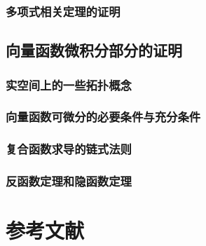 \documentclass[zihao=-4,linespread=1.5,a4paper,heading=true,twoside]{ctexbook}
\theoremstyle{definition}
\theoremstyle{plain}
\begin{document}
\section{多项式相关定理的证明}\label{sec:A.5}


\chapter{向量函数微积分部分的证明}\label{sec:B}
\section{实空间上的一些拓扑概念}\label{sec:B.1}


\section{向量函数可微分的必要条件与充分条件}\label{sec:B.2}


\section{复合函数求导的链式法则}\label{sec:B.3}


\section{反函数定理和隐函数定理}\label{sec:B.4}


%

%
%

\newpage\part*{参考文献}
\printbibliography[heading=none]
\end{document}
